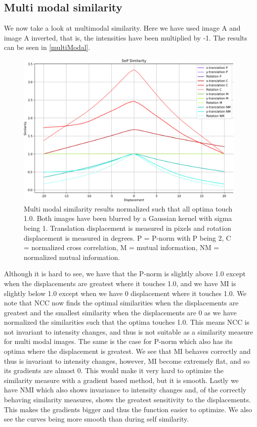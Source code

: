 \subsection{Multi modal similarity}
We now take a look at multimodal similarity. Here we have used image A and image A inverted, that is, the intensities have been multiplied by -1. The results can be seen in \autoref{multiModal}.

\begin{figure}
	\centering
	\includegraphics[width=0.8\linewidth]{Materials/multiModalSimilarity}
	\caption{Multi modal similarity results normalized such that all optima touch 1.0. Both images have been blurred by a Gaussian kernel with sigma being 1. Translation displacement is measured in pixels and rotation displacement is measured in degrees. P = P-norm with P being 2, C = normalized cross correlation, M = mutual information, NM = normalized mutual information.}
	\label{multiModal}
\end{figure}
Although it is hard to see, we have that the P-norm is slightly above 1.0 except when the displacements are greatest where it touches 1.0, and we have MI is slightly below 1.0 except when we have 0 displacement where it touches 1.0. We note that NCC now finds the optimal similarities when the displacements are greatest and the smallest similarity when the displacements are 0 as we have normalized the similarities such that the optima touches 1.0. This means NCC is not invariant to intensity changes, and thus is not suitable as a similarity measure for multi modal images. The same is the case for P-norm which also has its optima where the displacement is greatest. We see that  MI behaves correctly and thus is invariant to intensity changes, however, MI become extremely flat, and so its gradients are almost 0. This would make it very hard to optimize the similarity measure with a gradient based method, but it is smooth. Lastly we have NMI which also shows invariance to intensity changes and, of the correctly behaving similarity measures, shows the greatest sensitivity to the displacements. This makes the gradients bigger and thus the function easier to optimize. We also see the curves being more smooth than during self similarity.\\
